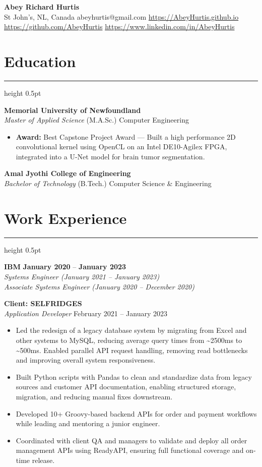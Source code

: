 \documentclass[a4paper]{article}
\newcommand{\tightsection}[1]{
  \vspace{-0.9em}
  \section*{#1}
  \vspace{-0.95em}
  {\color{gray}\hrule height 0.5pt}
  \vspace{0.5em}
}
\begin{document}
\fontsize{10.4pt}{10.4pt}\selectfont
\begin{center}
    {\LARGE \textbf{Abey Richard Hurtis}} \\
    St John’s, NL, Canada \textbar abeyhurtis@gmail.com 
    \textbar\href{https://AbeyHurtis.github.io}{https://AbeyHurtis.github.io}
    \textbar \href{https://github.com/AbeyHurtis}{https://github.com/AbeyHurtis} \textbar  \href{https://www.linkedin.com/in/AbeyHurtis}{https://www.linkedin.com/in/AbeyHurtis}
\end{center}


\tightsection{Education}
\textbf{Memorial University of Newfoundland} \\
\textit{Master of Applied Science} (M.A.Sc.) Computer Engineering 
\begin{itemize}
    \item \textbf{Award:} Best Capstone Project Award — Built a high performance 2D convolutional kernel using OpenCL on an Intel DE10-Agilex FPGA, integrated into a U-Net model for brain tumor segmentation.
\end{itemize}


\noindent\textbf{Amal Jyothi College of Engineering} \\
\textit{Bachelor of Technology} (B.Tech.) Computer Science \& Engineering 

\tightsection{Work Experience}

\textbf{IBM} \hfill \textbf{January 2020} -- \textbf{January 2023} \\
\textit{Systems Engineer (January 2021 -- January 2023)} \\
\textit{Associate Systems Engineer (January 2020 -- December 2020)} 

\vspace{0.5em}
\noindent
\textbf{Client: SELFRIDGES} \\
\textit{Application Developer} \hfill February 2021 -- January 2023  
\begin{itemize}[itemsep=1pt, topsep=1pt, parsep=0pt, partopsep=0pt]
    \item Led the redesign of a legacy database system by migrating from Excel and other systems to MySQL, reducing average query times from \textasciitilde2500ms to \textasciitilde500ms. Enabled parallel API request handling, removing read bottlenecks and improving overall system responsiveness.
    \item Built Python scripts with Pandas to clean and standardize data from legacy sources and customer API documentation, enabling structured storage, migration, and reducing manual fixes downstream.
    \item Developed 10+ Groovy-based backend APIs for order and payment workflows while leading and mentoring a junior engineer.
    \item Coordinated with client QA and managers to validate and deploy all order management APIs using ReadyAPI, ensuring full functional coverage and on-time release.
\end{itemize}
\end{document}
